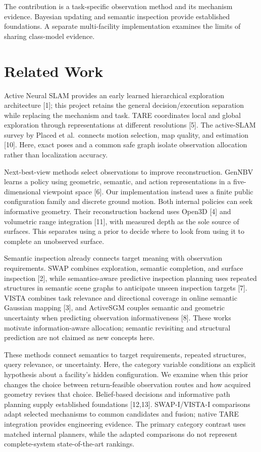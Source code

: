 \documentclass[11pt,a4paper]{article}
\begin{document}
The contribution is a task-specific observation method and its mechanism evidence. Bayesian updating and semantic inspection provide established foundations. A separate multi-facility implementation examines the limits of sharing class-model evidence.

\hypertarget{related-work}{%
\section{Related Work}\label{related-work}}

Active Neural SLAM provides an early learned hierarchical exploration architecture {[}1{]}; this project retains the general decision/execution separation while replacing the mechanism and task. TARE coordinates local and global exploration through representations at different resolutions {[}5{]}. The active-SLAM survey by Placed et al.~connects motion selection, map quality, and estimation {[}10{]}. Here, exact poses and a common safe graph isolate observation allocation rather than localization accuracy.

Next-best-view methods select observations to improve reconstruction. GenNBV learns a policy using geometric, semantic, and action representations in a five-dimensional viewpoint space {[}6{]}. Our implementation instead uses a finite public configuration family and discrete ground motion. Both internal policies can seek informative geometry. Their reconstruction backend uses Open3D {[}4{]} and volumetric range integration {[}11{]}, with measured depth as the sole source of surfaces. This separates using a prior to decide where to look from using it to complete an unobserved surface.

Semantic inspection already connects target meaning with observation requirements. SWAP combines exploration, semantic completion, and surface inspection {[}2{]}, while semantics-aware predictive inspection planning uses repeated structures in semantic scene graphs to anticipate unseen inspection targets {[}7{]}. VISTA combines task relevance and directional coverage in online semantic Gaussian mapping {[}3{]}, and ActiveSGM couples semantic and geometric uncertainty when predicting observation informativeness {[}8{]}. These works motivate information-aware allocation; semantic revisiting and structural prediction are not claimed as new concepts here.

These methods connect semantics to target requirements, repeated structures, query relevance, or uncertainty. Here, the category variable conditions an explicit hypothesis about a facility's hidden configuration. We examine when this prior changes the choice between return-feasible observation routes and how acquired geometry revises that choice. Belief-based decisions and informative path planning supply established foundations {[}12,13{]}. SWAP-I/VISTA-I comparisons adapt selected mechanisms to common candidates and fusion; native TARE integration provides engineering evidence. The primary category contrast uses matched internal planners, while the adapted comparisons do not represent complete-system state-of-the-art rankings.
\end{document}
